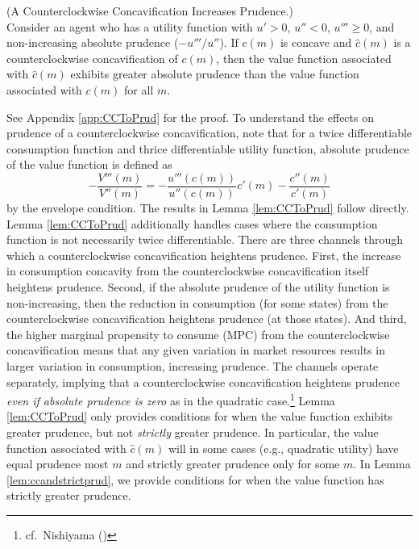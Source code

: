   \begin{lemma}\label{lem:CCToPrud}  (A Counterclockwise Concavification Increases Prudence.) \\
    Consider an agent who has a utility function %
    with $u' > 0$, $u'' < 0$, $u''' \geq 0$, and non-increasing absolute prudence ($-u'''/u''$). If $c({m})$ is concave and $\hat{c}({m})$ is a counterclockwise concavification of $c({m})$, then the value function associated with $\hat{c}({m})$ exhibits greater absolute prudence than the value function associated with $c({m})$ for all ${m}$.
  \end{lemma}

  \noindent See Appendix \ref{app:CCToPrud} for the proof. To understand the effects on prudence of a counterclockwise concavification, note that for a twice differentiable consumption function and thrice differentiable utility function, absolute prudence of the value function is defined as
  \begin{equation} -\frac{V'''({m})}{V''({m})} = - \frac{u'''(c({m}))}{u''(c({m}))}c'({m}) - \frac{c''({m})}{c'({m})} \label{eq:prudence}\end{equation}
  by the envelope condition. The results in Lemma \ref{lem:CCToPrud} follow directly. Lemma \ref{lem:CCToPrud} additionally handles cases where the consumption function is not necessarily twice differentiable.
  There are three channels through which a counterclockwise concavification heightens prudence. First, the increase in consumption concavity from the counterclockwise concavification itself heightens prudence. Second, if the absolute prudence of the utility function is non-increasing, then the reduction in consumption (for some states) from the counterclockwise concavification heightens prudence (at those states). And third, the higher marginal propensity to consume (MPC) from the counterclockwise concavification means that any given variation in market resources results in larger variation in consumption, increasing prudence. The channels operate separately, implying that a counterclockwise concavification heightens prudence \textit{even if absolute prudence is zero} as in the quadratic case.\footnote{cf.\ Nishiyama (\citeyear{nishiyama2012concavity})}
  Lemma \ref{lem:CCToPrud} only provides conditions for when the value function exhibits greater prudence, but not \textit{strictly} greater prudence. In particular, the value function associated with $\hat{c}({m})$ will in some cases (e.g., quadratic utility) have equal prudence most ${m}$ and strictly greater prudence only for some ${m}$. In Lemma \ref{lem:ccandstrictprud}, we provide conditions for when the value function has strictly greater prudence.
